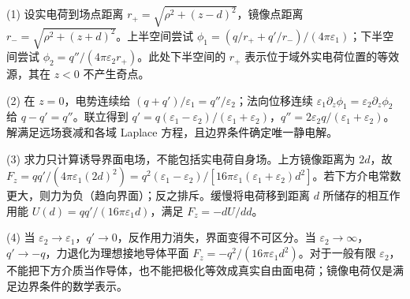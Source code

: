 (1) 设实电荷到场点距离 \(r_+=\sqrt{\rho^2+(z-d)^2}\)，镜像点距离 \(r_-=\sqrt{\rho^2+(z+d)^2}\)。上半空间尝试 \(\phi_1=(q/r_++q'/r_-)/(4\pi\varepsilon_1)\)；下半空间尝试 \(\phi_2=q''/(4\pi\varepsilon_2r_+)\)。此处下半空间的 \(r_+\) 表示位于域外实电荷位置的等效源，其在 \(z<0\) 不产生奇点。

(2) 在 \(z=0\)，电势连续给 \((q+q')/\varepsilon_1=q''/\varepsilon_2\)；法向位移连续 \(\varepsilon_1\partial_z\phi_1=\varepsilon_2\partial_z\phi_2\) 给 \(q-q'=q''\)。联立得到 \(q'=q(\varepsilon_1-\varepsilon_2)/(\varepsilon_1+\varepsilon_2)\)，\(q''=2\varepsilon_2q/(\varepsilon_1+\varepsilon_2)\)。解满足远场衰减和各域 Laplace 方程，且边界条件确定唯一静电解。

(3) 求力只计算诱导界面电场，不能包括实电荷自身场。上方镜像距离为 \(2d\)，故 \(F_z=q q'/(4\pi\varepsilon_1(2d)^2)=q^2(\varepsilon_1-\varepsilon_2)/[16\pi\varepsilon_1(\varepsilon_1+\varepsilon_2)d^2]\)。若下方介电常数更大，则力为负（趋向界面）；反之排斥。缓慢将电荷移到距离 \(d\) 所储存的相互作用能 \(U(d)=q q'/(16\pi\varepsilon_1d)\)，满足 \(F_z=-dU/dd\)。

(4) 当 \(\varepsilon_2\to\varepsilon_1\)，\(q'\to0\)，反作用力消失，界面变得不可区分。当 \(\varepsilon_2\to\infty\)，\(q'\to-q\)，力退化为理想接地导体平面 \(F_z=-q^2/(16\pi\varepsilon_1d^2)\)。对于一般有限 \(\varepsilon_2\)，不能把下方介质当作导体，也不能把极化等效成真实自由面电荷；镜像电荷仅是满足边界条件的数学表示。
